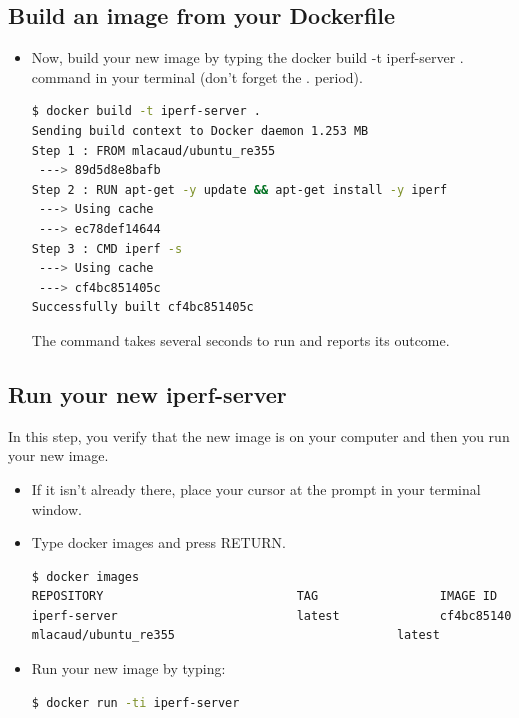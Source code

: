 \documentclass[a4paper,11pt]{exam}
\begin{document}
\subsection{Build an image from your Dockerfile}

\begin{itemize}
	\item Now, build your new image by typing the docker build -t iperf-server . command in your terminal (don’t forget the . period).
	
\begin{lstlisting}[frame=single,language={sh}]
$ docker build -t iperf-server .
Sending build context to Docker daemon 1.253 MB
Step 1 : FROM mlacaud/ubuntu_re355
 ---> 89d5d8e8bafb
Step 2 : RUN apt-get -y update && apt-get install -y iperf
 ---> Using cache
 ---> ec78def14644
Step 3 : CMD iperf -s
 ---> Using cache
 ---> cf4bc851405c
Successfully built cf4bc851405c
\end{lstlisting}

The command takes several seconds to run and reports its outcome.

\end{itemize}



\subsection{Run your new iperf-server \label{dusing}}
In this step, you verify that the new image is on your computer and then you run your new image.
\begin{itemize}
	
	\item If it isn’t already there, place your cursor at the prompt in your terminal window.
	\item Type docker images and press RETURN.
\begin{lstlisting}[frame=single,language={sh}]
$ docker images
REPOSITORY                           TAG                 IMAGE ID            CREATED             VIRTUAL SIZE
iperf-server                         latest              cf4bc851405c        3 minutes ago       210.4 MB
mlacaud/ubuntu_re355                               latest              89d5d8e8bafb        7 days ago          187.9 MB
\end{lstlisting}
	\item Run your new image by typing:
\begin{lstlisting}[frame=single,language={sh}]
$ docker run -ti iperf-server
\end{lstlisting}
\end{itemize}
\end{document}
